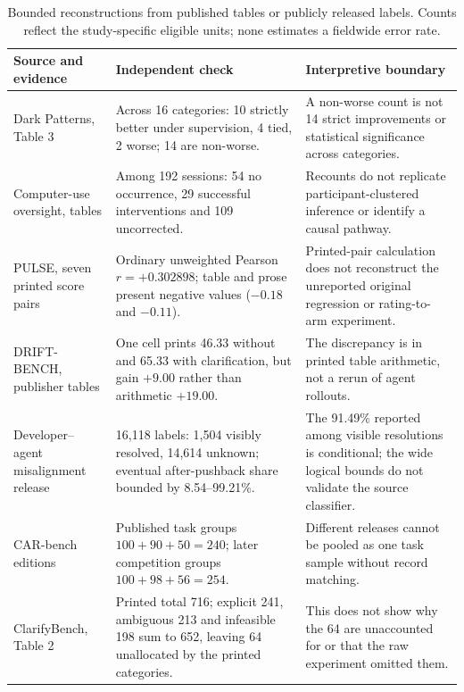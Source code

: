 \begin{table}[H]
\centering\small
\caption{Bounded reconstructions from published tables or publicly released labels. Counts reflect the study-specific eligible units; none estimates a fieldwide error rate.}
\label{tab:rechecks}
\begin{tabularx}{\textwidth}{@{}p{}p{}Y@{}}
\toprule
\textbf{Source and evidence} & \textbf{Independent check} & \textbf{Interpretive boundary}\\
\midrule
Dark Patterns, Table 3 \cite{ref22} & Across 16 categories: 10 strictly better under supervision, 4 tied, 2 worse; 14 are non-worse. & A non-worse count is not 14 strict improvements or statistical significance across categories.\\
Computer-use oversight, tables \cite{ref16} & Among 192 sessions: 54 no occurrence, 29 successful interventions and 109 uncorrected. & Recounts do not replicate participant-clustered inference or identify a causal pathway.\\
PULSE, seven printed score pairs \cite{ref36} & Ordinary unweighted Pearson $r=+0.302898$; table and prose present negative values ($-0.18$ and $-0.11$). & Printed-pair calculation does not reconstruct the unreported original regression or rating-to-arm experiment.\\
DRIFT-BENCH, publisher tables \cite{ref28} & One cell prints 46.33 without and 65.33 with clarification, but gain $+9.00$ rather than arithmetic $+19.00$. & The discrepancy is in printed table arithmetic, not a rerun of agent rollouts.\\
Developer--agent misalignment release \cite{ref35} & 16,118 labels: 1,504 visibly resolved, 14,614 unknown; eventual after-pushback share bounded by 8.54--99.21\%. & The 91.49\% reported among visible resolutions is conditional; the wide logical bounds do not validate the source classifier.\\
CAR-bench editions \cite{ref40} & Published task groups $100+90+50=240$; later competition groups $100+98+56=254$. & Different releases cannot be pooled as one task sample without record matching.\\
ClarifyBench, Table 2 \cite{ref41} & Printed total 716; explicit 241, ambiguous 213 and infeasible 198 sum to 652, leaving 64 unallocated by the printed categories. & This does not show why the 64 are unaccounted for or that the raw experiment omitted them.\\
\bottomrule
\end{tabularx}
\end{table}


